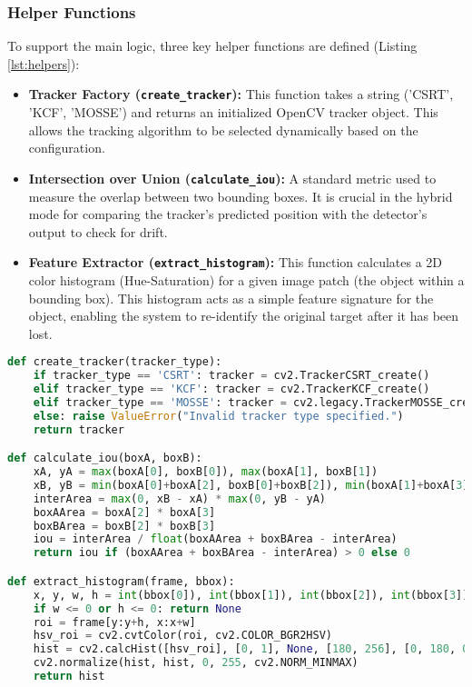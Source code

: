 \documentclass[12pt, a4paper]{article}
\begin{document}
\subsubsection{Helper Functions}
To support the main logic, three key helper functions are defined (Listing \ref{lst:helpers}):
\begin{itemize}
    \item \textbf{Tracker Factory (\texttt{create\_tracker}):} This function takes a string ('CSRT', 'KCF', 'MOSSE') and returns an initialized OpenCV tracker object. This allows the tracking algorithm to be selected dynamically based on the configuration.
    \item \textbf{Intersection over Union (\texttt{calculate\_iou}):} A standard metric used to measure the overlap between two bounding boxes. It is crucial in the hybrid mode for comparing the tracker's predicted position with the detector's output to check for drift.
    \item \textbf{Feature Extractor (\texttt{extract\_histogram}):} This function calculates a 2D color histogram (Hue-Saturation) for a given image patch (the object within a bounding box). This histogram acts as a simple feature signature for the object, enabling the system to re-identify the original target after it has been lost.
\end{itemize}

\begin{lstlisting}[language=Python, caption={Core helper functions for tracker creation and analysis.}, label={lst:helpers}]
def create_tracker(tracker_type):
    if tracker_type == 'CSRT': tracker = cv2.TrackerCSRT_create()
    elif tracker_type == 'KCF': tracker = cv2.TrackerKCF_create()
    elif tracker_type == 'MOSSE': tracker = cv2.legacy.TrackerMOSSE_create()
    else: raise ValueError("Invalid tracker type specified.")
    return tracker

def calculate_iou(boxA, boxB):
    xA, yA = max(boxA[0], boxB[0]), max(boxA[1], boxB[1])
    xB, yB = min(boxA[0]+boxA[2], boxB[0]+boxB[2]), min(boxA[1]+boxA[3], boxB[1]+boxB[3])
    interArea = max(0, xB - xA) * max(0, yB - yA)
    boxAArea = boxA[2] * boxA[3]
    boxBArea = boxB[2] * boxB[3]
    iou = interArea / float(boxAArea + boxBArea - interArea)
    return iou if (boxAArea + boxBArea - interArea) > 0 else 0

def extract_histogram(frame, bbox):
    x, y, w, h = int(bbox[0]), int(bbox[1]), int(bbox[2]), int(bbox[3])
    if w <= 0 or h <= 0: return None
    roi = frame[y:y+h, x:x+w]
    hsv_roi = cv2.cvtColor(roi, cv2.COLOR_BGR2HSV)
    hist = cv2.calcHist([hsv_roi], [0, 1], None, [180, 256], [0, 180, 0, 256])
    cv2.normalize(hist, hist, 0, 255, cv2.NORM_MINMAX)
    return hist
\end{lstlisting}
\end{document}
